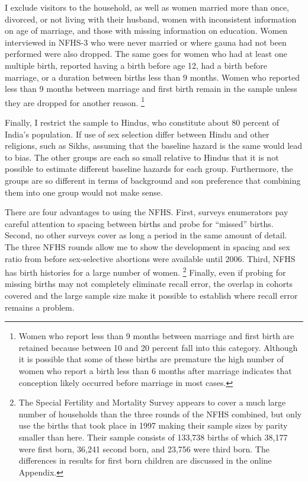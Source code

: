 \documentclass[12pt,letterpaper]{article}
\begin{document}
I exclude visitors to the household, as well as
women married more than once, divorced, or not living with their husband,
women with inconsistent information on age of marriage,
and those with missing information on education.
Women interviewed in NFHS-3 who were never married or where gauna had not
been performed were also dropped.
The same goes for women who had at least one multiple birth,
reported having a birth before age 12, had a birth before marriage, or
a duration between births less than 9 months.
Women who reported less than 9 months between marriage and first birth
remain in the sample unless they are dropped for another reason.%
\footnote{
Women who report less than 9 months between marriage and first birth are retained 
because between 10 and 20 percent fall into this category.
Although it is possible that some of these births are premature the high number of
women who report a birth less than 6 months after marriage indicates that conception
likely occurred before marriage in most cases.
}

Finally, I restrict the sample to Hindus,
who constitute about 80 percent of India's population.
If use of sex selection differ between Hindu and other religions, such 
as Sikhs, assuming that the baseline hazard is the same would lead to bias.
The other groups are each so small relative to Hindus that it is not
possible to estimate different baseline hazards for each group.
Furthermore, the groups are so different in terms of background and son preference
that combining them into one group would not make sense.

There are four advantages to using the NFHS.
First, surveys enumerators pay careful attention to spacing between births and
probe for ``missed'' births.
Second, no other surveys cover as long a period in the same amount of detail.
The three NFHS rounds allow me to show the development in spacing and 
sex ratio from before sex-selective abortions were available until 2006.
Third, NFHS has birth histories for a large number of women.%
\footnote{
The Special Fertility and Mortality Survey appears to cover a much large number of households
than the three rounds of the NFHS combined, but \citet{jha06} only use the births that 
took place in 1997 making their sample sizes by parity smaller than here.
Their sample consists of 133,738 births of which 38,177 were first
born, 36,241 second born, and 23,756 were third born.
The differences in results for first born children are discussed in the online 
Appendix.
}
Finally, even if probing for missing births may not completely eliminate recall error,   
the overlap in cohorts covered and the large sample size make it possible to establish 
where recall error remains a problem.
\end{document}
